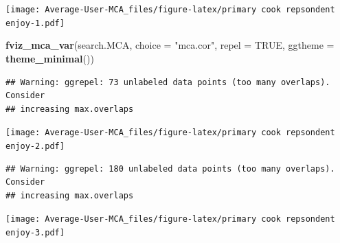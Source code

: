 \documentclass[
]{article}
\newenvironment{Shaded}{\begin{snugshade}}{\end{snugshade}}
\newcommand{\DataTypeTok}[1]{\textcolor[rgb]{0.13,0.29,0.53}{#1}}
\newcommand{\KeywordTok}[1]{\textcolor[rgb]{0.13,0.29,0.53}{\textbf{#1}}}
\newcommand{\NormalTok}[1]{#1}
\newcommand{\OtherTok}[1]{\textcolor[rgb]{0.56,0.35,0.01}{#1}}
\newcommand{\StringTok}[1]{\textcolor[rgb]{0.31,0.60,0.02}{#1}}
\begin{document}
\texttt{[image: Average-User-MCA\_files/figure-latex/primary cook repsondent enjoy-1.pdf]}

\begin{Shaded}
\begin{Highlighting}[]
\KeywordTok{fviz_mca_var}\NormalTok{(search.MCA, }\DataTypeTok{choice =} \StringTok{"mca.cor"}\NormalTok{, }\DataTypeTok{repel =} \OtherTok{TRUE}\NormalTok{,}
             \DataTypeTok{ggtheme =} \KeywordTok{theme_minimal}\NormalTok{())}
\end{Highlighting}
\end{Shaded}

\begin{verbatim}
## Warning: ggrepel: 73 unlabeled data points (too many overlaps). Consider
## increasing max.overlaps
\end{verbatim}

\texttt{[image: Average-User-MCA\_files/figure-latex/primary cook repsondent enjoy-2.pdf]}

\begin{Shaded}
\end{Shaded}

\begin{verbatim}
## Warning: ggrepel: 180 unlabeled data points (too many overlaps). Consider
## increasing max.overlaps
\end{verbatim}

\texttt{[image: Average-User-MCA\_files/figure-latex/primary cook repsondent enjoy-3.pdf]}
\end{document}
